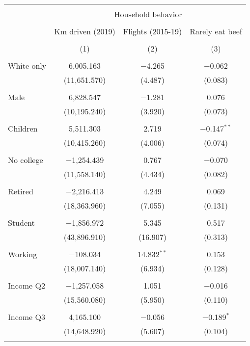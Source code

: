 
\begin{tabular}{@{\extracolsep{5pt}}lccc} 
\\[-1.8ex]\hline 
\hline \\[-1.8ex] 
 & \multicolumn{3}{c}{Household behavior} \\ 
\cline{2-4} 
\\[-1.8ex] & Km driven (2019) & Flights (2015-19) & Rarely eat beef \\ 
\\[-1.8ex] & (1) & (2) & (3)\\ 
\hline \\[-1.8ex] 
 White only & 6,005.163 & $-$4.265 & $-$0.062 \\ 
  & (11,651.570) & (4.487) & (0.083) \\ 
  & & & \\ 
 Male & 6,828.547 & $-$1.281 & 0.076 \\ 
  & (10,195.240) & (3.920) & (0.073) \\ 
  & & & \\ 
 Children & 5,511.303 & 2.719 & $-$0.147$^{**}$ \\ 
  & (10,415.260) & (4.006) & (0.074) \\ 
  & & & \\ 
 No college & $-$1,254.439 & 0.767 & $-$0.070 \\ 
  & (11,558.140) & (4.434) & (0.082) \\ 
  & & & \\ 
 Retired & $-$2,216.413 & 4.249 & 0.069 \\ 
  & (18,363.960) & (7.055) & (0.131) \\ 
  & & & \\ 
 Student & $-$1,856.972 & 5.345 & 0.517 \\ 
  & (43,896.910) & (16.907) & (0.313) \\ 
  & & & \\ 
 Working & $-$108.034 & 14.832$^{**}$ & 0.153 \\ 
  & (18,007.140) & (6.934) & (0.128) \\ 
  & & & \\ 
 Income Q2 & $-$1,257.058 & 1.051 & $-$0.016 \\ 
  & (15,560.080) & (5.950) & (0.110) \\ 
  & & & \\ 
 Income Q3 & 4,165.100 & $-$0.056 & $-$0.189$^{*}$ \\ 
  & (14,648.920) & (5.607) & (0.104) \\ 
  & & & \\ 

\end{tabular}
